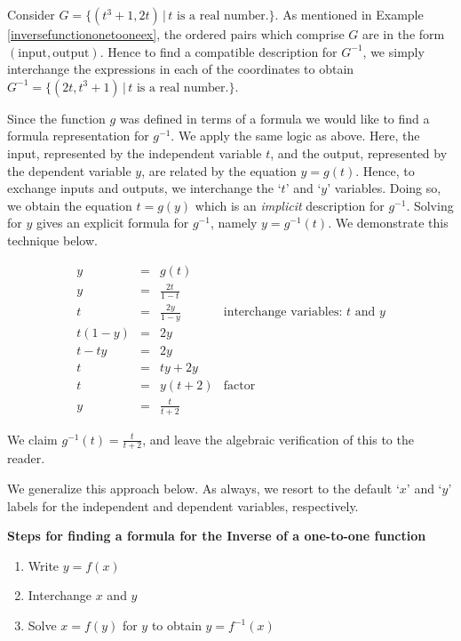 \documentclass{ximera}
\begin{document}
 Consider $G = \{ (t^3+1, 2t) \, | \, \text{$t$ is a real number.} \}$.  As mentioned in Example \ref{inversefunctiononetooneex}, the ordered pairs which comprise $G$ are in the form  $(\text{input}, \text{output})$.  Hence to find a compatible description for $G^{-1}$, we simply interchange the expressions in each of the coordinates to obtain  $G^{-1} = \{ (2t, t^3+1) \, | \, \text{$t$ is a real number.} \}$.
 
  
 Since the function $g$ was defined in terms of a formula we would like to find a formula representation for $g^{-1}$.  We apply the same logic as above.  Here, the input, represented by the independent variable $t$, and the output, represented by the dependent variable $y$, are related   by the  equation $y = g(t)$.  Hence, to exchange inputs and outputs,  we interchange the `$t$' and `$y$' variables.  Doing so, we obtain the equation $t = g(y)$  which is an \textit{implicit} description for $g^{-1}$.  Solving for $y$ gives an explicit formula for $g^{-1}$, namely $y = g^{-1}(t)$.  We demonstrate this technique below.

 
 \[ \begin{array}{rclr}
y & = & g(t) & \\  
y & = &  \frac{2t}{1-t} & \\  
t & = & \frac{2y}{1-y} & \text{interchange variables: $t$ and $y$} \\  
t(1-y) & = & 2y & \\  
t-ty & = & 2y & \\  
t & = & ty + 2y & \\  
t & = & y(t+2) & \text{factor}\\  
y & = & \frac{t}{t+2}
\end{array} \]

We claim $g^{-1}(t) = \frac{t}{t+2}$, and leave the algebraic verification of this to the reader.

We generalize this approach below.  As always, we resort to the default `$x$' and `$y$'  labels for the independent and dependent variables, respectively. 
   

 \label{inverseprocedure}

\centerline{\textbf{Steps for finding a formula for the Inverse of a one-to-one function}}  

\begin{enumerate}

\item  Write $y=f(x)$

\item Interchange $x$ and $y$

\item  Solve $x = f(y)$ for $y$ to obtain $y=f^{-1}(x)$

\end{enumerate}
\end{document}

